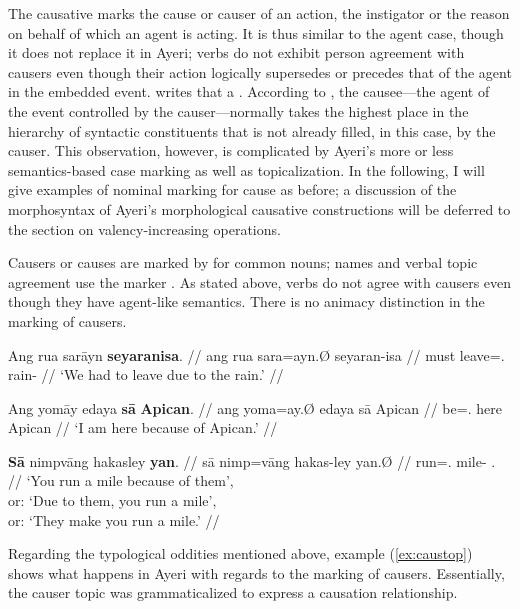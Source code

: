 The causative marks the cause or causer of an action, the instigator or the
reason on behalf of which an agent is acting. It is thus similar to the agent
case, though it does not replace it in Ayeri; verbs do not exhibit person
agreement with causers even though their action logically supersedes or
precedes that of the agent in the embedded event. \citet{dixon2000} writes that
a .
According to \citet[176]{comrie1989}, the causee---the agent of the event
controlled by the causer---normally takes the highest place in the hierarchy of
syntactic constituents that is not already filled, in this case, by the causer.
This observation, however, is complicated by Ayeri's more or less 
semantics-based case marking as well as topicalization. In the following, I 
will give examples of nominal marking for cause as before; a discussion of the
morphosyntax of Ayeri's morphological causative constructions will be deferred
to the section on valency-increasing operations. %

Causers or causes are marked by  for common nouns; names and
verbal topic agreement use the marker . As stated above, verbs do
not agree with causers even though they have agent-like semantics. There is no
animacy distinction in the marking of causers.

\pex
\a\begingl
	\gla Ang rua sarāyn \textbf{seyaranisa}. //
	\glb ang rua sara=ayn.Ø seyaran-isa //
	\glc \AgtT{} must leave=\Fpl{}.\Top{} rain-\Caus{} //
	\glft `We had to leave due to the rain.' //
\endgl

\a\begingl
	\gla Ang yomāy edaya \textbf{sā} \textbf{Apican}. //
	\glb ang yoma=ay.Ø edaya sā Apican //
	\glc \AgtT{} be=\Fsg{}.\Top{} here \Caus{} Apican //
	\glft `I am here because of Apican.' //
\endgl

\a\label{ex:caustop}\begingl
	\gla \textbf{Sā} nimpvāng hakasley \textbf{yan}. //
	\glb sā nimp=vāng hakas-ley yan.Ø //
	\glc \CauT{} run=\Ssg{}.\Aarg{} mile-\PargI{} \TplM{}.\Top{} //
	\glft `You run a mile because of them',\\
		or: `Due to them, you run a mile',\\
		or: `They make you run a mile.' //
\endgl

\xe

Regarding the typological oddities mentioned above, example (\ref{ex:caustop}) 
shows what happens in Ayeri with regards to the marking of causers. 
Essentially, the causer topic was grammaticalized to express a causation 
relationship.

